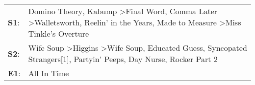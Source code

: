 \begin{supertabular}{p{0.03\textwidth}p{0.92\textwidth}}
 \textbf{S1}:  &  Domino Theory\textsuperscript{}, \enspace Kabump\textsuperscript{} \textgreater \enspace Final Word\textsuperscript{}, \enspace Comma Later\textsuperscript{} \textgreater \enspace Walletsworth\textsuperscript{}, \enspace Reelin' in the Years\textsuperscript{}, \enspace Made to Measure\textsuperscript{} \textgreater \enspace Miss Tinkle's Overture\textsuperscript{}  \enspace  \\
 \textbf{S2}:  &                         Wife Soup\textsuperscript{} \textgreater \enspace Higgins\textsuperscript{} \textgreater \enspace Wife Soup\textsuperscript{}, \enspace Educated Guess\textsuperscript{}, \enspace Syncopated Strangers[1]\textsuperscript{}, \enspace Partyin' Peeps\textsuperscript{}, \enspace Day Nurse\textsuperscript{}, \enspace Rocker Part 2\textsuperscript{}  \enspace  \\
 \textbf{E1}:  &                                                                                                                                                                                                                                                                                                                                                   All In Time\textsuperscript{}  \enspace  \\
\end{supertabular}
